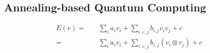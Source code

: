 \subsection{Annealing-based Quantum Computing}
\label{backg:annealing}


\begin{subequations}
\begin{align}
  \label{formula:dqm.form}
  E(v) =
  & \quad \sum_i a_i v_i + \sum_{i < j} b_{i, j} v_i v_j + c \\
  = & \quad \sum_i a_i v_i + \sum_{i < j} b_{i, j} \left( v_i \otimes v_j \right) + c
\end{align}
\end{subequations}

